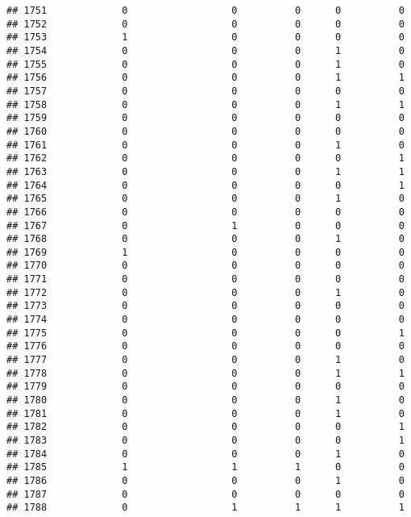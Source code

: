 \documentclass[
]{article}
\begin{document}
\begin{verbatim}
## 1751             0                  0          0      0          0
## 1752             0                  0          0      0          0
## 1753             1                  0          0      0          0
## 1754             0                  0          0      1          0
## 1755             0                  0          0      1          0
## 1756             0                  0          0      1          1
## 1757             0                  0          0      0          0
## 1758             0                  0          0      1          1
## 1759             0                  0          0      0          0
## 1760             0                  0          0      0          0
## 1761             0                  0          0      1          0
## 1762             0                  0          0      0          1
## 1763             0                  0          0      1          1
## 1764             0                  0          0      0          1
## 1765             0                  0          0      1          0
## 1766             0                  0          0      0          0
## 1767             0                  1          0      0          0
## 1768             0                  0          0      1          0
## 1769             1                  0          0      0          0
## 1770             0                  0          0      0          0
## 1771             0                  0          0      0          0
## 1772             0                  0          0      1          0
## 1773             0                  0          0      0          0
## 1774             0                  0          0      0          0
## 1775             0                  0          0      0          1
## 1776             0                  0          0      0          0
## 1777             0                  0          0      1          0
## 1778             0                  0          0      1          1
## 1779             0                  0          0      0          0
## 1780             0                  0          0      1          0
## 1781             0                  0          0      1          0
## 1782             0                  0          0      0          1
## 1783             0                  0          0      0          1
## 1784             0                  0          0      1          0
## 1785             1                  1          1      0          0
## 1786             0                  0          0      1          0
## 1787             0                  0          0      0          0
## 1788             0                  1          1      1          1

\end{verbatim}
\end{document}
